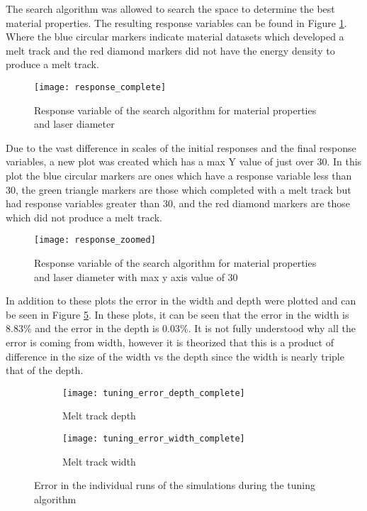 \label{results}

The search algorithm was allowed to search the space to determine the best material properties.  The resulting response variables can be found in Figure \ref{fig:response_complete}.  Where the blue circular markers indicate material datasets which developed a melt track and the red diamond markers did not have the energy density to produce a melt track.
\begin{figure}[!htb]
	\centering
	\texttt{[image: response\_complete]}
	\caption{Response variable of the search algorithm for material properties and laser diameter}
	\label{fig:response_complete}
\end{figure}
Due to the vast difference in scales of the initial responses and the final response variables, a new plot was created which has a max Y value of just over 30.  In this plot the blue circular markers are ones which have a response variable less than 30, the green triangle markers are those which completed with a melt track but had response variables greater than 30, and the red diamond markers are those which did not produce a melt track.
\begin{figure}[!htb]
	\centering
	\texttt{[image: response\_zoomed]}
	\caption{Response variable of the search algorithm for material properties and laser diameter with max y axis value of 30}
	\label{fig:response_zoomed}
\end{figure}
In addition to these plots the error in the width and depth were plotted and can be seen in Figure \ref{fig:tuning_error_complete}.  In these plots, it can be seen that the error in the width is 8.83\% and the error in the depth is 0.03\%.  It is not fully understood why all the error is coming from width, however it is theorized that this is a product of difference in the size of the width vs the depth since the width is nearly triple that of the depth.
\begin{figure}[!htb]\centering
	\begin{subfigure}[c]{0.475\textwidth}\centering
	\texttt{[image: tuning\_error\_depth\_complete]}
	\caption{Melt track depth}
	\label{fig:tuning_error_depth_complete}
	\end{subfigure}\hfill{}
		\begin{subfigure}[c]{0.475\textwidth}\centering
		\texttt{[image: tuning\_error\_width\_complete]}
		\caption{Melt track width}
		\label{fig:tuning_error_width_complete}
		\end{subfigure}
	\caption{Error in the individual runs of the simulations during the tuning algorithm}
	\label{fig:tuning_error_complete}
\end{figure}

